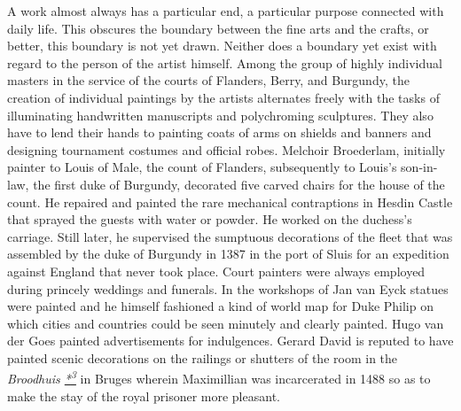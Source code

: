 A work almost always has a particular end, a particular purpose
connected with daily life. This obscures the boundary between the fine
arts and the crafts, or better, this boundary is not yet drawn. Neither
does a boundary yet exist with regard to the person of the artist
himself. Among the group of highly individual masters in the service of
the courts of Flanders, Berry, and Burgundy, the creation of individual
paintings by the artists alternates freely with the tasks of
illuminating handwritten manuscripts and polychroming sculptures. They
also have to lend their hands to painting coats of arms on shields and
banners and designing tournament costumes and official robes. Melchoir
Broederlam, initially painter to Louis of Male, the count of Flanders,
subsequently to Louis's son-in-law, the first duke of Burgundy,
decorated five carved chairs for the house of the count. He repaired and
painted the rare mechanical contraptions in Hesdin Castle that sprayed
the guests with water or powder. He worked on the duchess's carriage.
Still later, he supervised the sumptuous decorations of the fleet that
was assembled by the duke of Burgundy in 1387 in the port of Sluis for
an expedition against England that never took place. Court painters were
always employed during princely weddings and funerals. In the workshops
of Jan van Eyck statues were painted and he himself fashioned a kind of
world map for Duke Philip on which cities and countries could be seen
minutely and clearly painted. Hugo van der Goes painted advertisements
for indulgences. Gerard David is reputed to have painted scenic
decorations on the railings or shutters of the room in the
\emph{Broodhuis
\protect\hypertarget{20_ILLUSTRATIONS_FOLLOW_PAGE.xhtmlux5cux23id_2659}{\protect\hyperlink{23_NOTES.xhtmlux5cux23id_2660}{*\textsuperscript{3}}}}
in Bruges wherein Maximillian was incarcerated in 1488 so as to make the
stay of the royal prisoner more pleasant.

